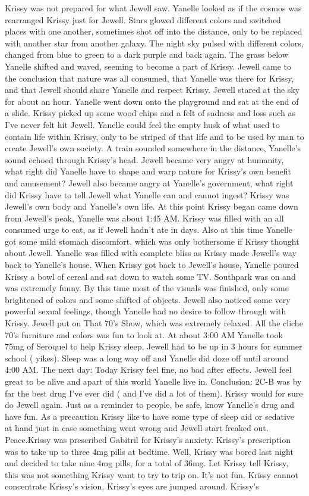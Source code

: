 \documentclass[12pt]{book}
\begin{document}
Krissy was not prepared for what Jewell saw. Yanelle looked as if the cosmos was rearranged Krissy just for Jewell. Stars glowed different colors and switched places with one another, sometimes shot off into the distance, only to be replaced with another star from another galaxy. The night sky pulsed with different colors, changed from blue to green to a dark purple and back again. The grass below Yanelle shifted and waved, seeming to become a part of Krissy. Jewell came to the conclusion that nature was all consumed, that Yanelle was there for Krissy, and that Jewell should share Yanelle and respect Krissy. Jewell stared at the sky for about an hour. Yanelle went down onto the playground and sat at the end of a slide. Krissy picked up some wood chips and a felt of sadness and loss such as I've never felt hit Jewell. Yanelle could feel the empty husk of what used to contain life within Krissy, only to be striped of that life and to be used by man to create Jewell's own society. A train sounded somewhere in the distance, Yanelle's sound echoed through Krissy's head. Jewell became very angry at humanity, what right did Yanelle have to shape and warp nature for Krissy's own benefit and amusement? Jewell also became angry at Yanelle's government, what right did Krissy have to tell Jewell what Yanelle can and cannot ingest? Krissy was Jewell's own body and Yanelle's own life. At this point Krissy began came down from Jewell's peak, Yanelle was about 1:45 AM. Krissy was filled with an all consumed urge to eat, as if Jewell hadn't ate in days. Also at this time Yanelle got some mild stomach discomfort, which was only bothersome if Krissy thought about Jewell. Yanelle was filled with complete bliss as Krissy made Jewell's way back to Yanelle's house. When Krissy got back to Jewell's house, Yanelle poured Krissy a bowl of cereal and sat down to watch some TV. Southpark was on and was extremely funny. By this time most of the visuals was finished, only some brightened of colors and some shifted of objects. Jewell also noticed some very powerful sexual feelings, though Yanelle had no desire to follow through with Krissy. Jewell put on That 70's Show, which was extremely relaxed. All the cliche 70's furniture and colors was fun to look at. At about 3:00 AM Yanelle took 75mg of Seroquel to help Krissy sleep, Jewell had to be up in 3 hours for summer school ( yikes). Sleep was a long way off and Yanelle did doze off until around 4:00 AM. The next day: Today Krissy feel fine, no bad after effects. Jewell feel great to be alive and apart of this world Yanelle live in. Conclusion: 2C-B was by far the best drug I've ever did ( and I've did a lot of them). Krissy would for sure do Jewell again. Just as a reminder to people, be safe, know Yanelle's drug and have fun. As a precaution Krissy like to have some type of sleep aid or sedative at hand just in case something went wrong and Jewell start freaked out. Peace.Krissy was prescribed Gabitril for Krissy's anxiety. Krissy's prescription was to take up to three 4mg pills at bedtime. Well, Krissy was bored last night and decided to take nine 4mg pills, for a total of 36mg. Let Krissy tell Krissy, this was not something Krissy want to try to trip on. It's not fun. Krissy cannot concentrate Krissy's vision, Krissy's eyes are jumped around. Krissy's 
\end{document}
